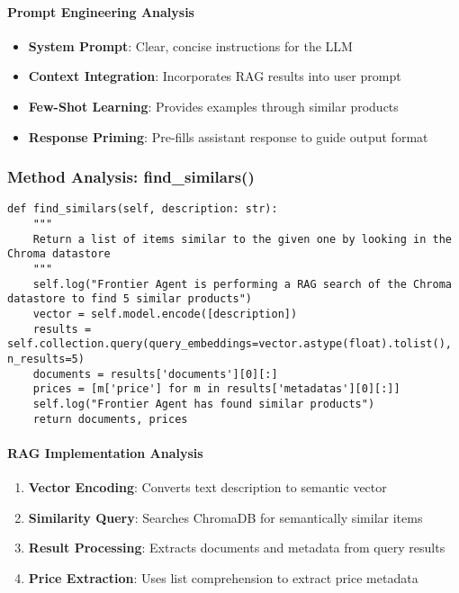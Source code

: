 \paragraph{Prompt Engineering Analysis}
\begin{itemize}
\item \textbf{System Prompt}: Clear, concise instructions for the LLM
\item \textbf{Context Integration}: Incorporates RAG results into user prompt
\item \textbf{Few-Shot Learning}: Provides examples through similar products
\item \textbf{Response Priming}: Pre-fills assistant response to guide output format
\end{itemize}

\subsubsection{Method Analysis: find\_similars()}

\begin{lstlisting}[caption=Vector Similarity Search]
def find_similars(self, description: str):
    """
    Return a list of items similar to the given one by looking in the Chroma datastore
    """
    self.log("Frontier Agent is performing a RAG search of the Chroma datastore to find 5 similar products")
    vector = self.model.encode([description])
    results = self.collection.query(query_embeddings=vector.astype(float).tolist(), n_results=5)
    documents = results['documents'][0][:]
    prices = [m['price'] for m in results['metadatas'][0][:]]
    self.log("Frontier Agent has found similar products")
    return documents, prices
\end{lstlisting}

\paragraph{RAG Implementation Analysis}
\begin{enumerate}
\item \textbf{Vector Encoding}: Converts text description to semantic vector
\item \textbf{Similarity Query}: Searches ChromaDB for semantically similar items
\item \textbf{Result Processing}: Extracts documents and metadata from query results
\item \textbf{Price Extraction}: Uses list comprehension to extract price metadata
\end{enumerate}

